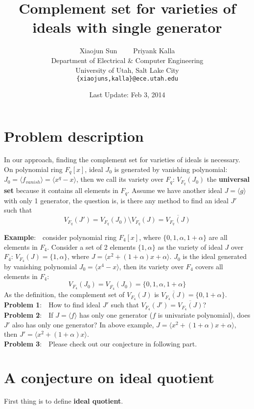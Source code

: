 \documentclass[12pt]{article}
\title{Complement set for varieties of ideals with single generator}
\author{Xiaojun Sun \ \ \ \ Priyank Kalla\\
\small Department of Electrical \& Computer Engineering\\[-0.8ex]
\small University of Utah, Salt Lake City\\
\small \texttt{\{xiaojuns,kalla\}@ece.utah.edu}
}
\date{Last Update: Feb 3, 2014}
\begin{document}
\maketitle

\section{Problem description}

In our approach, finding the complement set for varieties of ideals is necessary.
On polynomial ring $F_q[x]$, ideal $J_0$ is generated by vanishing polynomial: $J_0 = \langle f_{vanish}\rangle = \langle x^q-x\rangle$,
then we call its variety over $F_q$: $V_{F_q}(J_0)$ the \textbf{universal set} because it contains all elements in $F_q$.
Assume we have another ideal $J = \langle g\rangle$ with only 1 generator, the question is, is there any method
to find an ideal $J'$ such that
\[
V_{F_q}(J') = V_{F_q}(J_0) \setminus V_{F_q}(J) = \overline{V_{F_q}(J)}
\]

{\bf Example}:\ \ consider polynomial ring $F_4[x]$, where $\{0,1,\alpha, 1+\alpha\}$ are all elements in $F_4$.
Consider a set of 2 elements $\{1,\alpha\}$ as the variety of ideal $J$ over $F_4$:
$V_{F_4}(J) = \{1,\alpha\}$, where $J=\langle x^2+(1+\alpha)x+\alpha\rangle$. $J_0$ is the ideal generated by vanishing
polynomial $J_0 = \langle x^4-x\rangle$, then its variety over $F_4$ covers all elements in $F_4$:
\[
V_{F_4}(J_0) = V_{\overline{F_4}}(J_0) = \{0,1,\alpha,1+\alpha\}
\]
As the definition, the complement set of $V_{F_4}(J)$ is $\overline{V_{F_4}(J)} = \{0,1+\alpha\}$.
\\
{\bf Problem 1}:\ \ How to find ideal $J'$ such that $V_{F_4}(J') = \overline{V_{F_4}(J)}$?\\
{\bf Problem 2}:\ \ If $J = \langle f\rangle$ has only one generator ($f$ is univariate polynomial), does
$J'$ also has only one generator? In above example, $J = \langle x^2+(1+\alpha)x+\alpha\rangle$,
then $J' = \langle x^2+(1+\alpha)x\rangle$.
\\
{\bf Problem 3}:\ \ Please check out our conjecture in following part.

\section{A conjecture on ideal quotient}
First thing is to define \textbf{ideal quotient}.\\
\end{document}
